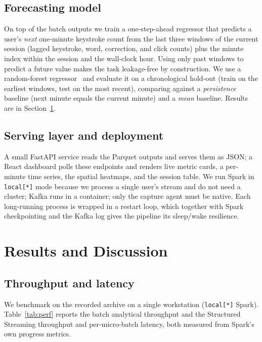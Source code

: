 \documentclass[conference]{IEEEtran}
\begin{document}
\subsection{Forecasting model}
\label{sec:ml}
On top of the batch outputs we train a one-step-ahead regressor that
predicts a user's \emph{next} one-minute keystroke count from the last
three windows of the current session (lagged keystroke, word, correction,
and click counts) plus the minute index within the session and the
wall-clock hour. Using only past windows to predict a future value makes
the task leakage-free by construction. We use a random-forest
regressor~\cite{breiman2001random,pedregosa2011scikit} and evaluate it on
a chronological hold-out (train on the earliest windows, test on the most
recent), comparing against a \emph{persistence} baseline (next minute
equals the current minute) and a \emph{mean} baseline. Results are in
Section~\ref{sec:results}.

\subsection{Serving layer and deployment}
A small FastAPI service reads the Parquet outputs and serves them as JSON;
a React dashboard polls these endpoints and renders live metric cards, a
per-minute time series, the spatial heatmaps, and the session table. We
run Spark in \texttt{local[*]} mode because we process a single user's
stream and do not need a cluster; Kafka runs in a container; only the
capture agent must be native. Each long-running process is wrapped in a
restart loop, which together with Spark checkpointing and the Kafka log
gives the pipeline its sleep/wake resilience.

\section{Results and Discussion}
\label{sec:results}

\subsection{Throughput and latency}
We benchmark on the recorded archive on a single workstation
(\texttt{local[*]} Spark). Table~\ref{tab:perf} reports the batch
analytical throughput and the Structured Streaming throughput and
per-micro-batch latency, both measured from Spark's own progress metrics.
\end{document}
